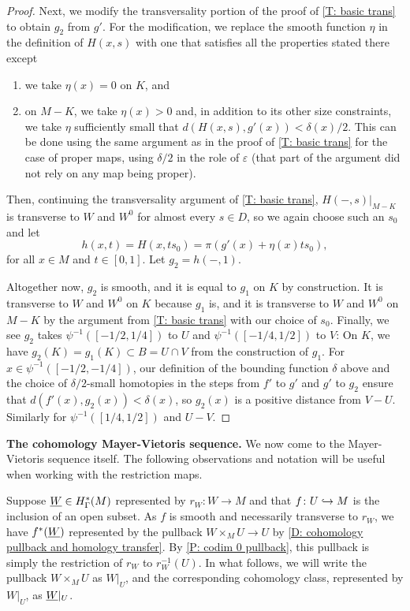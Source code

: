\begin{proof}
	Next, we modify the transversality portion of the proof of \cref{T: basic trans} to obtain $g_2$ from $g'$.
	For the modification, we replace the smooth function $\eta$ in the definition of $H(x,s)$ with one that satisfies all the properties stated there except
	\begin{enumerate}
		\item we take $\eta(x)=0$ on $K$, and
		\item on $M - K$, we take $\eta(x) > 0$ and, in addition to its other size constraints, we take $\eta$ sufficiently small that $d(H(x,s),g'(x)) < \delta(x)/2$.
		This can be done using the same argument as in the proof of \cref{T: basic trans} for the case of proper maps, using $\delta/2$ in the role of $\varepsilon$ (that part of the argument did not rely on any map being proper).
	\end{enumerate}
	Then, continuing the transversality argument of \cref{T: basic trans}, $H(-,s)|_{M-K}$ is transverse to $W$ and $W^0$ for almost every $s \in D$, so we again choose such an $s_0$ and let $$h(x,t) = H(x, ts_0) = \pi(g'(x) + \eta(x)ts_0),$$ for all $x \in M$ and $t \in [0,1]$.
	Let $g_2 = h(-,1)$.

	Altogether now, $g_2$ is smooth, and it is equal to $g_1$ on $K$ by construction.
	It is transverse to $W$ and $W^0$ on $K$ because $g_1$ is, and it is transverse to $W$ and $W^0$ on $M - K$ by the argument from \cref{T: basic trans} with our choice of $s_0$.
	Finally, we see $g_2$ takes $\psi^{-1}([-1/2,1/4])$ to $U$ and $\psi^{-1}([-1/4,1/2])$ to $V$: On $K$, we have $g_2(K) = g_1(K) \subset B = U \cap V$ from the construction of $g_1$.
	For $x\in \psi^{-1}([-1/2,-1/4])$, our definition of the bounding function $\delta$ above and the choice of $\delta/2$-small homotopies in the steps from $f'$ to $g'$ and $g'$ to $g_2$ ensure that $d(f'(x), g_2(x)) < \delta(x)$, so $g_2(x)$ is a positive distance from $V - U$.
	Similarly for $\psi^{-1}([1/4,1/2])$ and $U - V$.
\end{proof}



\medskip

\noindent\textbf{The cohomology Mayer-Vietoris sequence.} We now come to the Mayer-Vietoris sequence itself.
The following observations and notation will be useful when working with the restriction maps.

Suppose $\underline{W} \in H^*_\Gamma(M)$ represented by $r_W \colon W \to M$ and that $f \colon U \hookrightarrow M$ is the inclusion of an open subset.
As $f$ is smooth and necessarily transverse to $r_W$, we have $f^*(\underline{W})$ represented by the pullback $W \times_M U \to U$ by \cref{D: cohomology pullback and homology transfer}.	By \cref{P: codim 0 pullback}, this pullback is simply the restriction of $r_W$ to $r_W^{-1}(U)$.
In what follows, we will write the pullback $W \times_M U$ as $W|_U$, and the corresponding cohomology class, represented by $W|_U$, as $\underline{W}|_U$.

